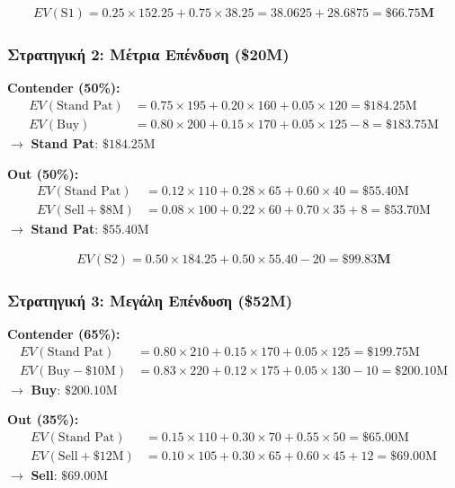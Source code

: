 \documentclass[a4paper,12pt]{article}
\begin{document}
\begin{align}
EV(\text{S1}) = 0.25 \times 152.25 + 0.75 \times 38.25 = 38.0625 + 28.6875 = \mathbf{\$66.75\text{M}}
\end{align}

\subsubsection{Στρατηγική 2: Μέτρια Επένδυση (\$20M)}

\textbf{Contender (50\%):}
\begin{align}
EV(\text{Stand Pat}) &= 0.75 \times 195 + 0.20 \times 160 + 0.05 \times 120 = \$184.25\text{M} \\
EV(\text{Buy}) &= 0.80 \times 200 + 0.15 \times 170 + 0.05 \times 125 - 8 = \$183.75\text{M}
\end{align}
$\rightarrow$ \textbf{Stand Pat}: $\$184.25\text{M}$

\textbf{Out (50\%):}
\begin{align}
EV(\text{Stand Pat}) &= 0.12 \times 110 + 0.28 \times 65 + 0.60 \times 40 = \$55.40\text{M} \\
EV(\text{Sell} + \$8\text{M}) &= 0.08 \times 100 + 0.22 \times 60 + 0.70 \times 35 + 8 = \$53.70\text{M}
\end{align}
$\rightarrow$ \textbf{Stand Pat}: $\$55.40\text{M}$

\begin{align}
EV(\text{S2}) = 0.50 \times 184.25 + 0.50 \times 55.40 - 20 = \mathbf{\$99.83\text{M}}
\end{align}

\subsubsection{Στρατηγική 3: Μεγάλη Επένδυση (\$52M)}

\textbf{Contender (65\%):}
\begin{align}
EV(\text{Stand Pat}) &= 0.80 \times 210 + 0.15 \times 170 + 0.05 \times 125 = \$199.75\text{M} \\
EV(\text{Buy} - \$10\text{M}) &= 0.83 \times 220 + 0.12 \times 175 + 0.05 \times 130 - 10 = \$200.10\text{M}
\end{align}
$\rightarrow$ \textbf{Buy}: $\$200.10\text{M}$

\textbf{Out (35\%):}
\begin{align}
EV(\text{Stand Pat}) &= 0.15 \times 110 + 0.30 \times 70 + 0.55 \times 50 = \$65.00\text{M} \\
EV(\text{Sell} + \$12\text{M}) &= 0.10 \times 105 + 0.30 \times 65 + 0.60 \times 45 + 12 = \$69.00\text{M}
\end{align}
$\rightarrow$ \textbf{Sell}: $\$69.00\text{M}$
\end{document}
